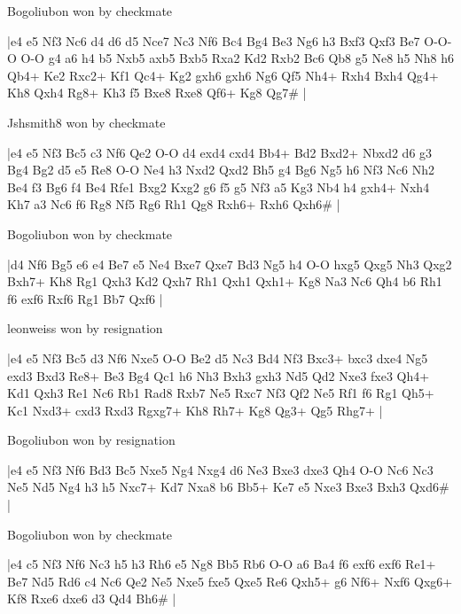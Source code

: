 \showboard

Bogoliubon won by checkmate

\makegametitle
|e4 e5 Nf3 Nc6 d4 d6 d5 Nce7 Nc3 Nf6 Bc4 Bg4 Be3 Ng6 h3 Bxf3 Qxf3 Be7 O-O-O O-O g4 a6 h4 b5 Nxb5 axb5 Bxb5 Rxa2 Kd2 Rxb2 Bc6 Qb8 g5 Ne8 h5 Nh8 h6 Qb4+ Ke2 Rxc2+ Kf1 Qc4+ Kg2 gxh6 gxh6 Ng6 Qf5 Nh4+ Rxh4 Bxh4 Qg4+ Kh8 Qxh4 Rg8+ Kh3 f5 Bxe8 Rxe8 Qf6+ Kg8 Qg7\#  |

\showboard

Jshsmith8 won by checkmate

\makegametitle
|e4 e5 Nf3 Bc5 c3 Nf6 Qe2 O-O d4 exd4 cxd4 Bb4+ Bd2 Bxd2+ Nbxd2 d6 g3 Bg4 Bg2 d5 e5 Re8 O-O Ne4 h3 Nxd2 Qxd2 Bh5 g4 Bg6 Ng5 h6 Nf3 Nc6 Nh2 Be4 f3 Bg6 f4 Be4 Rfe1 Bxg2 Kxg2 g6 f5 g5 Nf3 a5 Kg3 Nb4 h4 gxh4+ Nxh4 Kh7 a3 Nc6 f6 Rg8 Nf5 Rg6 Rh1 Qg8 Rxh6+ Rxh6 Qxh6\#  |

\showboard

Bogoliubon won by checkmate

\makegametitle
|d4 Nf6 Bg5 e6 e4 Be7 e5 Ne4 Bxe7 Qxe7 Bd3 Ng5 h4 O-O hxg5 Qxg5 Nh3 Qxg2 Bxh7+ Kh8 Rg1 Qxh3 Kd2 Qxh7 Rh1 Qxh1 Qxh1+ Kg8 Na3 Nc6 Qh4 b6 Rh1 f6 exf6 Rxf6 Rg1 Bb7 Qxf6  |

\showboard

leonweiss won by resignation

\makegametitle
|e4 e5 Nf3 Bc5 d3 Nf6 Nxe5 O-O Be2 d5 Nc3 Bd4 Nf3 Bxc3+ bxc3 dxe4 Ng5 exd3 Bxd3 Re8+ Be3 Bg4 Qc1 h6 Nh3 Bxh3 gxh3 Nd5 Qd2 Nxe3 fxe3 Qh4+ Kd1 Qxh3 Re1 Nc6 Rb1 Rad8 Rxb7 Ne5 Rxc7 Nf3 Qf2 Ne5 Rf1 f6 Rg1 Qh5+ Kc1 Nxd3+ cxd3 Rxd3 Rgxg7+ Kh8 Rh7+ Kg8 Qg3+ Qg5 Rhg7+  |

\showboard

Bogoliubon won by resignation

\makegametitle
|e4 e5 Nf3 Nf6 Bd3 Bc5 Nxe5 Ng4 Nxg4 d6 Ne3 Bxe3 dxe3 Qh4 O-O Nc6 Nc3 Ne5 Nd5 Ng4 h3 h5 Nxc7+ Kd7 Nxa8 b6 Bb5+ Ke7 e5 Nxe3 Bxe3 Bxh3 Qxd6\#  |

\showboard

Bogoliubon won by checkmate

\makegametitle
|e4 c5 Nf3 Nf6 Nc3 h5 h3 Rh6 e5 Ng8 Bb5 Rb6 O-O a6 Ba4 f6 exf6 exf6 Re1+ Be7 Nd5 Rd6 c4 Nc6 Qe2 Ne5 Nxe5 fxe5 Qxe5 Re6 Qxh5+ g6 Nf6+ Nxf6 Qxg6+ Kf8 Rxe6 dxe6 d3 Qd4 Bh6\#  |

